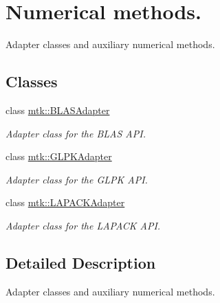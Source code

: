 \hypertarget{group__c05-num__methods}{\section{Numerical methods.}
\label{group__c05-num__methods}
}


Adapter classes and auxiliary numerical methods.  


\subsection*{Classes}
\begin{DoxyCompactItemize}
\item 
class \hyperlink{classmtk_1_1BLASAdapter}{mtk\-::\-B\-L\-A\-S\-Adapter}
\begin{DoxyCompactList}\small\item\em Adapter class for the B\-L\-A\-S A\-P\-I. \end{DoxyCompactList}\item 
class \hyperlink{classmtk_1_1GLPKAdapter}{mtk\-::\-G\-L\-P\-K\-Adapter}
\begin{DoxyCompactList}\small\item\em Adapter class for the G\-L\-P\-K A\-P\-I. \end{DoxyCompactList}\item 
class \hyperlink{classmtk_1_1LAPACKAdapter}{mtk\-::\-L\-A\-P\-A\-C\-K\-Adapter}
\begin{DoxyCompactList}\small\item\em Adapter class for the L\-A\-P\-A\-C\-K A\-P\-I. \end{DoxyCompactList}\end{DoxyCompactItemize}


\subsection{Detailed Description}
Adapter classes and auxiliary numerical methods. 